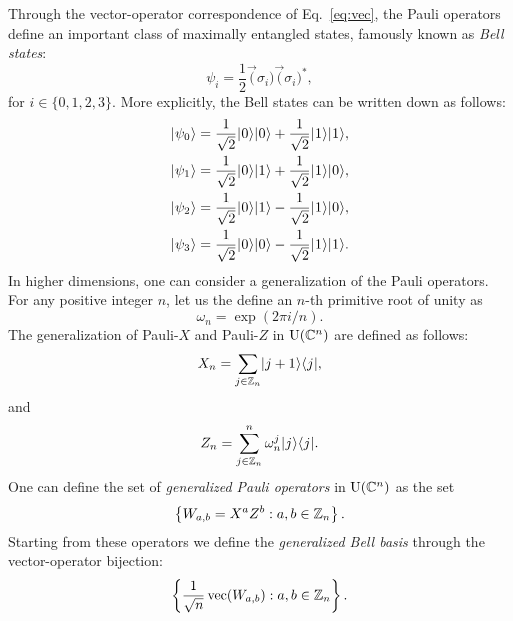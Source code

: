 Through the vector-operator correspondence of Eq.~\ref{eq:vec}, 
the Pauli operators define an important class of maximally
entangled states, famously known as \emph{Bell states}:
\begin{equation}
  \psi_{i} = \frac{1}{2}\vec(\sigma_{i})\vec(\sigma_{i})^{\ast},
\end{equation}
for $i \in \{0,1,2,3\}$. More explicitly, the Bell states can be written down as follows:
\begin{equation} 
\label{eq:Bell-states}
  \begin{aligned}
    \ket{\psi_0} & = \frac{1}{\sqrt{2}}\ket{0}\ket{0} 
    + \frac{1}{\sqrt{2}}\ket{1}\ket{1},\\
    \ket{\psi_1} & = \frac{1}{\sqrt{2}}\ket{0}\ket{1} 
    + \frac{1}{\sqrt{2}}\ket{1}\ket{0},\\
    \ket{\psi_2} & = \frac{1}{\sqrt{2}}\ket{0}\ket{1} 
    - \frac{1}{\sqrt{2}}\ket{1}\ket{0},\\
    \ket{\psi_3} & = \frac{1}{\sqrt{2}}\ket{0}\ket{0} 
    - \frac{1}{\sqrt{2}}\ket{1}\ket{1}.
  \end{aligned}
\end{equation}
In higher dimensions, one can consider a generalization of the Pauli operators.
For any positive integer $n$, let us the define an $n$-th primitive root of unity as 
\begin{equation}
  \omega_{n} = \exp(2\pi i/n).
\end{equation}
The generalization of Pauli-$X$ and Pauli-$Z$ in $\mathrm{U}(\mathbb{C}^{n})$ 
are defined as follows:
\begin{equation}
  X_{n} = \sum_{j \in \mathbb{Z}_{n}}\lvert\mspace{0.5mu} j+1 \mspace{0.5mu} \rangle\langle\mspace{0.5mu} j \mspace{0.5mu} \rvert,
\end{equation}
and
\begin{equation}
  Z_{n} = \sum_{j \in \mathbb{Z}_{n}}^{n}\omega_{n}^{j}\lvert\mspace{0.5mu} j \mspace{0.5mu} \rangle\langle\mspace{0.5mu} j \mspace{0.5mu} \rvert.
\end{equation}
One can define the set of \emph{generalized Pauli operators} in $\mathrm{U}(\mathbb{C}^{n})$ as the set
\begin{equation}
\label{eq:generalized-Pauli-operators}
  \left\{ W_{a,b} = X^{a}Z^{b} : a,b\in\integer_{n}\right\}.
\end{equation}
Starting from these operators we define the \emph{generalized Bell basis}
through the vector-operator bijection:
\begin{equation}
\label{eq:generalized-bell-basis}
  \left\{ \frac{1}{\sqrt{n}}\vec(W_{a,b}) : a,b\in\integer_{n} \right\}.
\end{equation}

